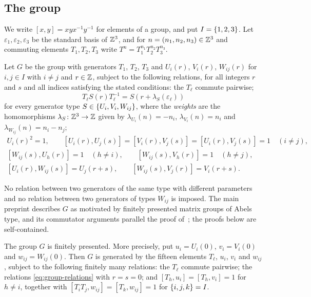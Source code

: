 \subsection{The group}
\label{subsec:group}

We write ${[x,y]=xyx^{-1}y^{-1}}$ for elements of a group, and put
${I=\set{1,2,3}}$. Let $\varepsilon_1,\varepsilon_2,\varepsilon_3$ be the
standard basis of $\mathbb{Z}^3$, and for ${n=(n_1,n_2,n_3)\in\mathbb{Z}^3}$ and commuting
elements $T_1,T_2,T_3$ write ${T^n=T_1^{n_1}T_2^{n_2}T_3^{n_3}}$.

\begin{definition}
  \label{def:selection-group}
  Let $G$ be the group with generators $T_1$, $T_2$, $T_3$ and $U_i(r)$,
  $V_i(r)$, $W_{ij}(r)$ for ${i,j\in I}$ with ${i\neq j}$ and ${r\in\mathbb{Z}}$, subject
  to the following relations, for all integers $r$ and $s$ and all indices
  satisfying the stated conditions: the $T_\ell$ commute pairwise;
  \begin{equation}
    \label{eq:group-conjugation}
    T_\ell S(r)T_\ell^{-1}=S(r+\lambda_S(\varepsilon_\ell))
  \end{equation}
  for every generator type ${S\in\set{U_i,V_i,W_{ij}}}$, where the
  \emph{weights} are the homomorphisms ${\lambda_S\colon\mathbb{Z}^3\to\mathbb{Z}}$ given by
  ${\lambda_{U_i}(n)=-n_i}$, ${\lambda_{V_i}(n)=n_i}$ and
  ${\lambda_{W_{ij}}(n)=n_i-n_j}$;
  \begin{equation}
    \label{eq:group-relations}
    \begin{gathered}
      U_i(r)^2=1,\qquad
      [U_i(r),U_j(s)]=[V_i(r),V_j(s)]=[U_i(r),V_j(s)]=1\quad(i\neq j),\\
      [W_{ij}(s),U_h(r)]=1\quad(h\neq i),\qquad
      [W_{ij}(s),V_h(r)]=1\quad(h\neq j),\\
      [U_i(r),W_{ij}(s)]=U_j(r+s),\qquad[W_{ij}(s),V_j(r)]=V_i(r+s).
    \end{gathered}
  \end{equation}
\end{definition}

No relation between two generators of the same type with different parameters
and no relation between two generators of types $W_{ij}$ is imposed. The main
preprint describes $G$ as motivated by finitely presented matrix groups of
Abels type, and its commutator arguments parallel the proof
of~\cite[Proposition~4.9, relations (4.9) and (4.10)]{San22}; the proofs below
are self-contained.

\begin{proposition}
  \label{prop:group-presentation}
  The group $G$ is finitely presented. More precisely, put ${u_i=U_i(0)}$,
  ${v_i=V_i(0)}$ and ${w_{ij}=W_{ij}(0)}$. Then $G$ is generated by the fifteen
  elements $T_\ell$, $u_i$, $v_i$ and $w_{ij}$, subject to the following
  finitely many relations: the $T_\ell$ commute pairwise; the relations
  \eqref{eq:group-relations} with ${r=s=0}$; and ${[T_h,u_i]=[T_h,v_i]=1}$ for
  ${h\neq i}$, together with ${[T_iT_j,w_{ij}]=[T_k,w_{ij}]=1}$ for
  ${\set{i,j,k}=I}$.
\end{proposition}

